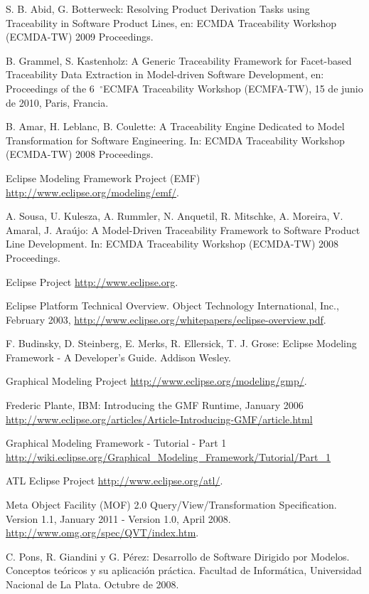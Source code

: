 \documentclass[a4paper,12pt,oneside,spanish]{book}
\newcommand{\grad}{\hspace{-2mm}$\phantom{a}^{\circ}$}
\begin{document}
\begin{thebibliography}{99}
 S. B. Abid, G. Botterweck: Resolving Product Derivation Tasks using Traceability in Software Product Lines, en: ECMDA Traceability Workshop (ECMDA-TW) 2009 Proceedings.

 B. Grammel, S. Kastenholz: A Generic Traceability Framework for Facet-based Traceability Data Extraction in Model-driven Software Development, en: Proceedings of the 6\grad ECMFA Traceability Workshop (ECMFA-TW), 15 de junio de 2010, Paris, Francia.

 B. Amar, H. Leblanc, B. Coulette: A Traceability Engine Dedicated to Model Transformation for Software Engineering. In: ECMDA Traceability Workshop (ECMDA-TW) 2008 Proceedings.

 Eclipse Modeling Framework Project (EMF) \url{http://www.eclipse.org/modeling/emf/}.

 A. Sousa, U. Kulesza, A. Rummler, N. Anquetil, R. Mitschke, A. Moreira, V. Amaral, J. Araújo: A Model-Driven Traceability Framework to Software Product Line Development. In: ECMDA Traceability Workshop (ECMDA-TW) 2008 Proceedings.

 Eclipse Project \url{http://www.eclipse.org}.

 Eclipse Platform Technical Overview. Object Technology International, Inc., February 2003,
\url{http://www.eclipse.org/whitepapers/eclipse-overview.pdf}.

 F. Budinsky, D. Steinberg, E. Merks, R. Ellersick, T. J. Grose: Eclipse Modeling Framework - A Developer's Guide. Addison Wesley.

 Graphical Modeling Project \url{http://www.eclipse.org/modeling/gmp/}.

 Frederic Plante, IBM: Introducing the GMF Runtime, January 2006 \url{http://www.eclipse.org/articles/Article-Introducing-GMF/article.html}

 Graphical Modeling Framework - Tutorial - Part 1 \url{http://wiki.eclipse.org/Graphical_Modeling_Framework/Tutorial/Part_1}

 ATL Eclipse Project \url{http://www.eclipse.org/atl/}.

 Meta Object Facility (MOF) 2.0 Query/View/Transformation Specification. Version 1.1, January 2011 - Version 1.0, April 2008. \url{http://www.omg.org/spec/QVT/index.htm}.

 C. Pons, R. Giandini y G. Pérez: Desarrollo de Software Dirigido por Modelos. Conceptos teóricos y su aplicación práctica. Facultad de Informática, Universidad Nacional de La Plata. Octubre de 2008.


\end{thebibliography}
\end{document}
